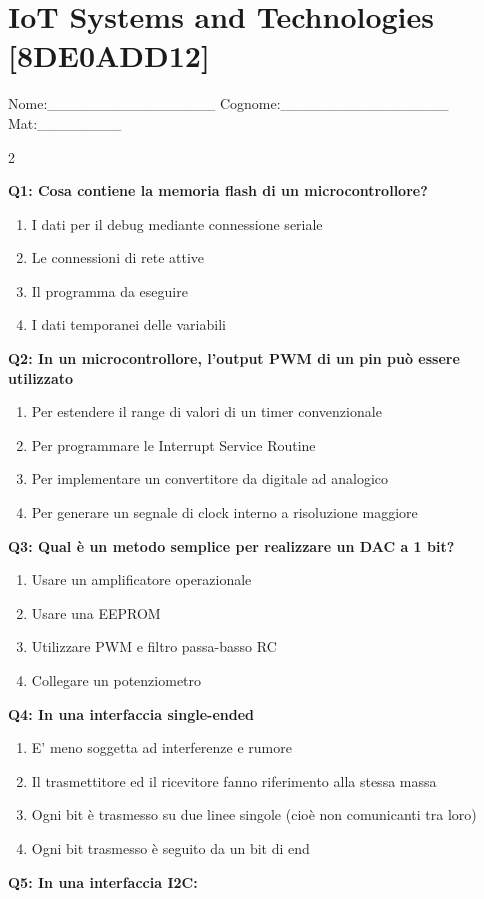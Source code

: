 \documentclass[10pt]{article}
\begin{document}
\newpage

\section*{IoT Systems and Technologies \footnotesize [8DE0ADD12]}
{\footnotesize Nome:\_\_\_\_\_\_\_\_\_\_\_\_\_\_\_\_ Cognome:\_\_\_\_\_\_\_\_\_\_\_\_\_\_\_\_ Mat:\_\_\_\_\_\_\_\_}
\begin{multicols}{2}

\textbf{Q1: Cosa contiene la memoria flash di un microcontrollore?}

\begin{enumerate}[label=\arabic*.]
\item I dati per il debug mediante connessione seriale
\item Le connessioni di rete attive
\item Il programma da eseguire
\item I dati temporanei delle variabili
\end{enumerate}
\textbf{Q2: In un microcontrollore, l'output PWM di un pin può essere utilizzato}

\begin{enumerate}[label=\arabic*.]
\item Per estendere il range di valori di un timer convenzionale
\item Per programmare le Interrupt Service Routine
\item Per implementare un convertitore da digitale ad analogico
\item Per generare un segnale di clock interno a risoluzione maggiore
\end{enumerate}
\textbf{Q3: Qual è un metodo semplice per realizzare un DAC a 1 bit?}

\begin{enumerate}[label=\arabic*.]
\item Usare un amplificatore operazionale
\item Usare una EEPROM
\item Utilizzare PWM e filtro passa-basso RC
\item Collegare un potenziometro
\end{enumerate}
\textbf{Q4: In una interfaccia single-ended}

\begin{enumerate}[label=\arabic*.]
\item E' meno soggetta ad interferenze e rumore
\item Il trasmettitore ed il ricevitore fanno riferimento alla stessa massa
\item Ogni bit è trasmesso su due linee singole (cioè non comunicanti tra loro)
\item Ogni bit trasmesso è seguito da un bit di end
\end{enumerate}
\textbf{Q5: In una interfaccia I2C:}


\end{multicols}
\end{document}
